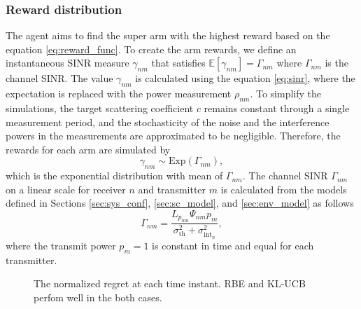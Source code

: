 \documentclass[english, 12pt, a4paper, elec, utf8, a-1b, online]{aaltothesis}
\newcommand{\E}[1]{\mathbb{E}\left[ #1 \right]}
\newcommand{\thnoise}{\sigma^2_{\text{th}}}
\newcommand{\epower}{p_{m}}
\newcommand{\eintnoise}{\sigma^2_{\text{int}_{n}}}
\newcommand{\esinr}{\gamma_{{nm}}}
\newcommand{\esinrexp}{\Gamma_{nm}}
\newcommand{\epl}{L_{p_{nm}}}
\newcommand{\ercs}{\Psi_{nm}}
\newcommand{\esp}{\rho_{nm}}
\begin{document}
\subsubsection{Reward distribution}

The agent aims to find the super arm with the highest reward based on the equation \eqref{eq:reward_func}. 
To create the arm rewards, we define an instantaneous SINR measure $\esinr$ that satisfies $\E{\esinr} = \esinrexp$ where $\esinrexp$ is the channel SINR. 
The value $\esinr$ is calculated using the equation \eqref{eq:sinr}, where the expectation is replaced with the power measurement $\esp$. 
To simplify the simulations, 
the target scattering coefficient $c$ remains constant through a single measurement period, and the stochasticity of the noise and the interference powers in the measurements are approximated to be negligible. 
Therefore, the rewards for each arm are simulated by
\begin{equation}
    \esinr  \sim \text{Exp}\left(\esinrexp\right),
\end{equation}
which is the exponential distribution with mean of $\esinrexp$.
The channel SINR $\esinrexp$ on a linear scale for receiver $n$ and transmitter $m$ is calculated from the models defined in Sections \ref{sec:sys_conf}, \ref{sec:sc_model}, and \ref{sec:env_model} as follows
\begin{equation}
    \esinrexp = \frac{\epl \ercs \epower}{\thnoise + \eintnoise},
\end{equation}
where the transmit power $\epower=1$ is constant in time and equal for each transmitter.


\begin{figure}[!tb]\centering
    \hfill
    \caption{The normalized regret at each time instant. 
            RBE and KL-UCB perfom well in the both cases.}
    \label{fig:regret}
\end{figure}
\end{document}
